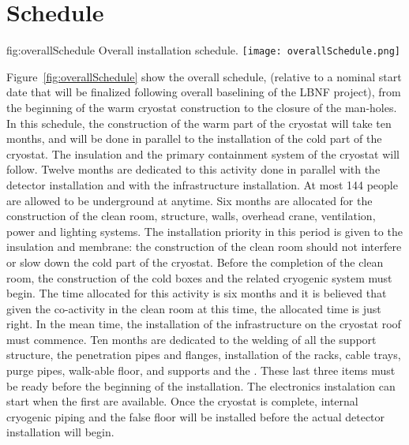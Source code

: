 \section{Schedule}
\label{ch:dp-tc-schedrisk}



\begin{dunefigure}{fig:overallSchedule}
{Overall installation schedule.}
\texttt{[image: overallSchedule.png]}
\end{dunefigure}

Figure~\ref{fig:overallSchedule} show the overall schedule, (relative to a nominal start date that will be finalized following overall baselining of the LBNF project), from the beginning of the warm cryostat construction to the closure of the man-holes.
In this schedule, the construction of the warm part of the  cryostat will take ten months, and will be done in parallel to the installation of the cold part of the  cryostat.
The insulation and the primary containment system of the  cryostat will follow.
Twelve months are dedicated to this activity done in parallel with the  detector installation and with the  infrastructure installation.
At most 144 people are allowed to be underground at anytime.
Six months are allocated for the construction of the clean room, structure, walls, overhead crane, ventilation, power and lighting systems. 
The installation priority in this period is given to the insulation and membrane: the construction of the clean room should not interfere or slow down the cold part of the cryostat.
Before the completion of the clean room, the construction of the cold boxes and the related cryogenic system must begin.
The time allocated for this activity is six months and it is believed that given the co-activity in the clean room at this time, the allocated time is just right.
In the mean time, the installation of the infrastructure on the cryostat roof must commence.
Ten months are dedicated to the welding of all the support structure, the penetration pipes and flanges, installation of the racks, cable trays, purge pipes, walk-able floor,  and  supports and the .
These last three items must be ready before the beginning of the  installation.
The electronics instalation can start when the first  are available.
Once the cryostat is complete, internal cryogenic piping and the false floor will be installed before the actual detector installation will begin.
